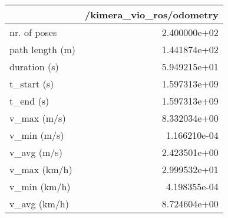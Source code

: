 \begin{tabular}{lr}
\toprule
{} &  /kimera\_vio\_ros/odometry \\
\midrule
nr. of poses    &              2.400000e+02 \\
path length (m) &              1.441874e+02 \\
duration (s)    &              5.949215e+01 \\
t\_start (s)     &              1.597313e+09 \\
t\_end (s)       &              1.597313e+09 \\
v\_max (m/s)     &              8.332034e+00 \\
v\_min (m/s)     &              1.166210e-04 \\
v\_avg (m/s)     &              2.423501e+00 \\
v\_max (km/h)    &              2.999532e+01 \\
v\_min (km/h)    &              4.198355e-04 \\
v\_avg (km/h)    &              8.724604e+00 \\
\bottomrule
\end{tabular}
